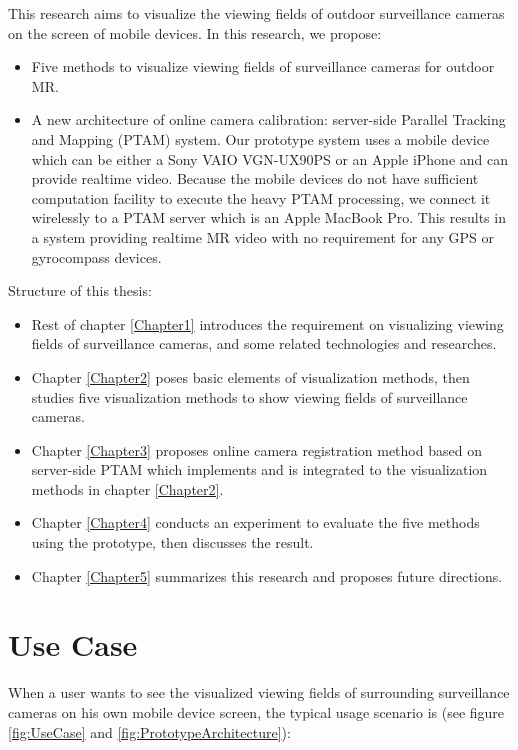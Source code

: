This research aims to visualize the viewing fields of outdoor surveillance cameras on the screen of mobile devices. In this research, we propose:

\begin{itemize}
	\item Five methods to visualize viewing fields of surveillance cameras for outdoor MR.
	\item A new architecture of online camera calibration: server-side Parallel Tracking and Mapping (PTAM) \cite{Reference12} system. Our prototype system uses a mobile device which can be either a Sony VAIO VGN-UX90PS or an Apple iPhone and can provide realtime video. Because the mobile devices do not have sufficient computation facility to execute the heavy PTAM processing, we connect it wirelessly to a PTAM server which is an Apple MacBook Pro. This results in a system providing realtime MR video with no requirement for any GPS or gyrocompass devices.
\end{itemize}

Structure of this thesis:

\begin{itemize}
	\item Rest of chapter \ref{Chapter1} introduces the requirement on visualizing viewing fields of surveillance cameras, and some related technologies and researches.
	\item Chapter \ref{Chapter2} poses basic elements of visualization methods, then studies five visualization methods to show viewing fields of surveillance cameras.
	\item Chapter \ref{Chapter3} proposes online camera registration method based on server-side PTAM which implements and is integrated to the visualization methods in chapter \ref{Chapter2}.
	\item Chapter \ref{Chapter4} conducts an experiment to evaluate the five methods using the prototype, then discusses the result.
	\item Chapter \ref{Chapter5} summarizes this research and proposes future directions.
\end{itemize}


\section{Use Case}
\label{UseCase}

When a user wants to see the visualized viewing fields of surrounding surveillance cameras on his own mobile device screen, the typical usage scenario is (see figure \ref{fig:UseCase} and \ref{fig:PrototypeArchitecture}):

